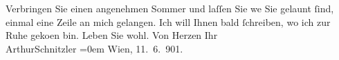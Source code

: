 \begin{ledgroupsized}[t]{13cm}
           \pstart
           Verbringen Sie einen angenehmen Sommer und laſſen Sie we{\geminationn}{ }Sie gelaunt ſind, einmal eine Zeile an mich
                    gelangen. Ich will Ihnen bald ſchreiben, wo ich zur Ruhe geko{\geminationm}en {\pb}bin.
                    Leben Sie wohl. Von Herzen\pend
           \pstart
           Ihr{\\[\baselineskip]}\spacefill\mbox{ArthurSchnitzler}\pend
           \leftskip=0em{}\pstart
           Wien,
                        11. 6. 901.\pend
           \endnumbering{}\end{ledgroupsized}  \newcommand{\dateiname}{L01127}\newcommand{\titel}{Arthur Schnitzler an Georg Brandes, 11. 6. 1901}\newcommand{\editorInnen}{Martin Anton Müller und Gerd-Hermann Susen}
      